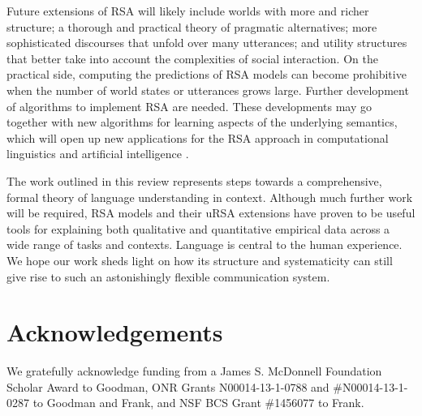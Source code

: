 \documentclass[]{elsarticle}
\begin{document}



Future extensions of RSA will likely include worlds with more and richer structure; 
a thorough and practical theory of pragmatic alternatives; 
more sophisticated discourses that unfold over many utterances; 
and utility structures that better take into account the complexities of social interaction.
On the practical side, computing the predictions of RSA models can
become prohibitive when the number of world states or utterances grows
large. Further development of algorithms to implement RSA are needed.
These
developments may go together with new algorithms for learning aspects of
the underlying semantics, which will open up new applications for the
RSA approach in computational linguistics and artificial intelligence \citep{golland2010,vogel2013b,monroe2015,andreas2016}.

The work outlined in this review represents steps towards a
comprehensive, formal theory of language understanding in context. Although
much further work will be required, RSA models and their uRSA extensions have
proven to be useful tools for explaining both qualitative and
quantitative empirical data across a wide range of tasks and contexts.
Language is central to the human experience. We hope our work sheds
light on how its structure and systematicity can still give rise to such
an astonishingly flexible communication system.

\section{Acknowledgements}

We gratefully acknowledge funding from a James S. McDonnell Foundation Scholar Award to Goodman,
 ONR Grants N00014-13-1-0788 and \#N00014-13-1-0287 to Goodman and Frank, and NSF BCS Grant \#1456077 to Frank.
\end{document}
